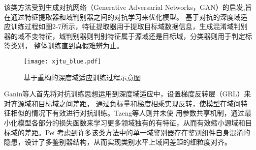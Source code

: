 该类方法受到生成对抗网络（Generative Adversarial Networks，GAN）的启发,旨在通过特征提取器和域判别器之间的对抗学习来优化模型。
基于对抗的深度域适应训练过程如图2-7所示，特征提取器用于提取目标域数据信息，生成混淆域判别器的域不变特征，域判别器则判别特征属于源域还是目标域，分类器则用于判定标签类别，
整体训练直到真假难辨为止。
\begin{figure}[H]
    \centering
    \texttt{[image: xjtu\_blue.pdf]}
    \caption{基于重构的深度域适应训练过程示意图}
\end{figure}
Ganin等人\cite{ganin2015unsupervised}首先将对抗训练思想运用到深度域适应中，设置梯度反转层（GRL）来对齐源域和目标域之间差距，
通过负标量和梯度相乘实现反转，使模型在域间特征相似的情况下有效进行对抗训练。Tzeng等人\cite{tzeng2017adversarial}则并未使
用参数共享机制，通过最小化模型各部分的损失函数来学习更多领域独有的有特征，从而有效缩小源域和目标域的差距。Pei\cite{pei2018multi}
考虑到许多该类方法中的单一域鉴别器存在鉴别组件自身混淆的隐患，设计了多鉴别器结构，从而实现类别水平上域间差距的细粒度对齐。


